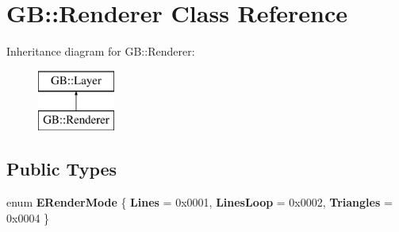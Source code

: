\hypertarget{class_g_b_1_1_renderer}{}\section{GB\+::Renderer Class Reference}
\label{class_g_b_1_1_renderer}
Inheritance diagram for GB\+::Renderer\+:\begin{figure}[H]
\begin{center}
\leavevmode
\includegraphics[height=2.000000cm]{class_g_b_1_1_renderer}
\end{center}
\end{figure}
\subsection*{Public Types}
\begin{DoxyCompactItemize}
\item 
\mbox{\label{class_g_b_1_1_renderer_ac462e7c4031b37cd3b55abbb9da4f50c}} 
enum {\bfseries E\+Render\+Mode} \{ {\bfseries Lines} = 0x0001, 
{\bfseries Lines\+Loop} = 0x0002, 
{\bfseries Triangles} = 0x0004
 \}
\end{DoxyCompactItemize}
